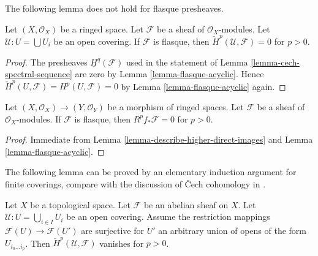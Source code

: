 \noindent
The following lemma does not hold for flasque presheaves.

\begin{lemma}
\label{lemma-flasque-acyclic-cech}
Let $(X, \mathcal{O}_X)$ be a ringed space.
Let $\mathcal{F}$ be a sheaf of $\mathcal{O}_X$-modules.
Let $\mathcal{U} : U = \bigcup U_i$ be an open covering.
If $\mathcal{F}$ is flasque, then
$\check{H}^p(\mathcal{U}, \mathcal{F}) = 0$ for $p > 0$.
\end{lemma}

\begin{proof}
The presheaves $\underline{H}^q(\mathcal{F})$ used in the statement
of Lemma \ref{lemma-cech-spectral-sequence} are zero by
Lemma \ref{lemma-flasque-acyclic}.
Hence $\check{H}^p(U, \mathcal{F}) = H^p(U, \mathcal{F}) = 0$
by Lemma \ref{lemma-flasque-acyclic} again.
\end{proof}

\begin{lemma}
\label{lemma-flasque-acyclic-pushforward}
Let $(X, \mathcal{O}_X) \to (Y, \mathcal{O}_Y)$ be a morphism
of ringed spaces. Let $\mathcal{F}$ be a sheaf of $\mathcal{O}_X$-modules.
If $\mathcal{F}$ is flasque, then
$R^pf_*\mathcal{F} = 0$ for $p > 0$.
\end{lemma}

\begin{proof}
Immediate from 
Lemma \ref{lemma-describe-higher-direct-images} and
Lemma \ref{lemma-flasque-acyclic}.
\end{proof}

\noindent
The following lemma can be proved by an elementary induction
argument for finite coverings, compare with the discussion
of {\v C}ech cohomology in \cite{FOAG}.

\begin{lemma}
\label{lemma-vanishing-ravi}
Let $X$ be a topological space. Let $\mathcal{F}$ be an abelian sheaf
on $X$. Let $\mathcal{U} : U = \bigcup_{i \in I} U_i$ be an
open covering. Assume the restriction mappings
$\mathcal{F}(U) \to \mathcal{F}(U')$ are surjective
for $U'$ an arbitrary union of opens of the form $U_{i_0 \ldots i_p}$.
Then $\check{H}^p(\mathcal{U}, \mathcal{F})$
vanishes for $p > 0$.
\end{lemma}

